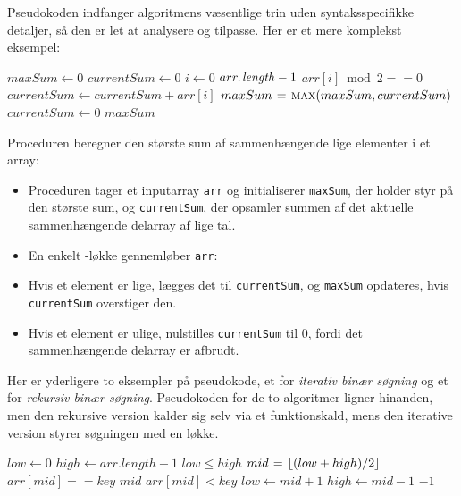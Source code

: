 Pseudokoden indfanger algoritmens væsentlige trin uden syntaksspecifikke detaljer, så den er let at analysere og tilpasse. Her er et mere komplekst eksempel:

\begin{codebox}
    \li $maxSum \gets 0$ 
    \li $currentSum \gets 0$ 
    \li \For $i \gets 0$ \To $\attrib{arr}{length} - 1$ \Do
    \li \If $arr[i] \bmod 2 == 0$ \Then
    \li $currentSum \gets currentSum + arr[i]$ 
    \li $maxSum \gets \proc{max}(maxSum, currentSum)$ 
    \li \Else \li $currentSum \gets 0$  \End \End
    \li \Return $maxSum$ 
\end{codebox}

Proceduren beregner den største sum af sammenhængende lige elementer i et array:

\begin{itemize}
    \item Proceduren tager et inputarray \texttt{arr} og initialiserer \texttt{maxSum}, der holder styr på den største sum, og \texttt{currentSum}, der opsamler summen af det aktuelle sammenhængende delarray af lige tal.
    \item En enkelt \texttt{\For}-løkke gennemløber \texttt{arr}:
    \item Hvis et element er lige, lægges det til \texttt{currentSum}, og \texttt{maxSum} opdateres, hvis \texttt{currentSum} overstiger den.
    \item Hvis et element er ulige, nulstilles \texttt{currentSum} til 0, fordi det sammenhængende delarray er afbrudt.
\end{itemize}

Her er yderligere to eksempler på pseudokode, et for \textit{iterativ binær søgning }og et for \textit{rekursiv binær søgning}. Pseudokoden for de to algoritmer ligner hinanden, men den rekursive version kalder sig selv via et funktionskald, mens den iterative version styrer søgningen med en løkke.

\begin{codebox}
    \li $low \gets 0$ 
    \li $high \gets arr.length -1$ 
    \li \While $low \leq high$ \Do
    \li     $mid \mathrel{\hspace{1pt}=\hspace{1pt}} \left\lfloor (low + high) / 2 \right\rfloor$ 
    \li     \If $arr[mid] == key$ \Then
    \li         \Return $mid$ 
    \li     \ElseIf $arr[mid] < key$ \Then
    \li         $low \gets mid + 1$ 
    \li     \Else
    \li         $high \gets mid - 1$ 
        \End
        \End
    \li \Return $-1$ 
\end{codebox}

